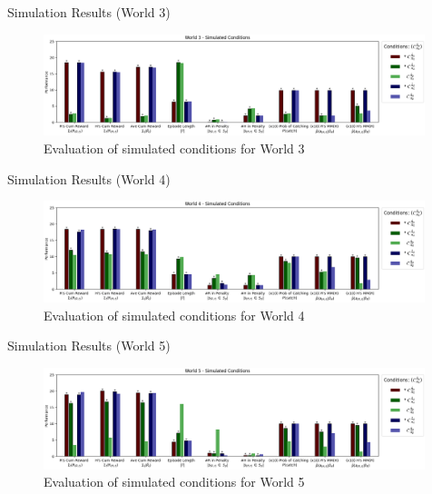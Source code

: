 \documentclass[aspectratio=1610, xcolor=dvipsnames]{packages/beamer}
\begin{document}
\begin{frame}{Simulation Results (World 3)}
     \begin{figure} \centering
        \includegraphics[width=0.99\textwidth]{../results/policy_comparisons/Fig_AssumptionComparison_W3}
        \caption{Evaluation of simulated conditions for World 3}
        \label{fig:PolicyCompW3}
    \end{figure}
\end{frame}

\begin{frame}{Simulation Results (World 4)}
     \begin{figure} \centering
        \includegraphics[width=0.99\textwidth]{../results/policy_comparisons/Fig_AssumptionComparison_W4}
        \caption{Evaluation of simulated conditions for World 4}
        \label{fig:PolicyCompW4}
    \end{figure}
\end{frame}

\begin{frame}{Simulation Results (World 5)}
     \begin{figure} \centering
        \includegraphics[width=0.99\textwidth]{../results/policy_comparisons/Fig_AssumptionComparison_W5}
        \caption{Evaluation of simulated conditions for World 5}
        \label{fig:PolicyCompW5}
    \end{figure}
\end{frame}
\end{document}
